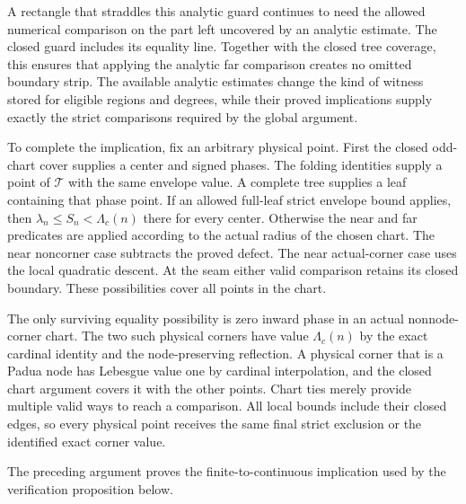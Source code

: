 A rectangle that straddles this analytic guard continues to need the
allowed numerical comparison on the part left uncovered by an
analytic estimate. The closed guard includes its equality line.
Together with the closed tree coverage, this ensures that applying
the analytic far comparison creates no omitted boundary strip.
The available analytic estimates change the kind of witness stored
for eligible regions and degrees, while their proved implications
supply exactly the strict comparisons required by the global
argument.

To complete the implication, fix an arbitrary physical point.
First the closed odd-chart cover supplies a center and signed phases.
The folding identities supply a point of $\mathcal T$ with the
same envelope value. A complete tree supplies a leaf containing that
phase point. If an allowed full-leaf strict envelope bound applies,
then $\lambda_n\leq S_n<\Lambda_c(n)$ there for every center.
Otherwise the near and far predicates are applied according to the
actual radius of the chosen chart. The near noncorner case subtracts
the proved defect. The near actual-corner case uses the local
quadratic descent. At the seam either valid comparison retains its
closed boundary. These possibilities cover all points in the chart.

The only surviving equality possibility is zero inward phase in an
actual nonnode-corner chart. The two such physical corners have
value $\Lambda_c(n)$ by the exact cardinal identity and the
node-preserving reflection. A physical corner that is a Padua node
has Lebesgue value one by cardinal interpolation, and the closed
chart argument covers it with the other points. Chart ties merely
provide multiple valid ways to reach a comparison. All local bounds
include their closed edges, so every physical point receives the
same final strict exclusion or the identified exact corner value.

The preceding argument proves the finite-to-continuous implication
used by the verification proposition below.

